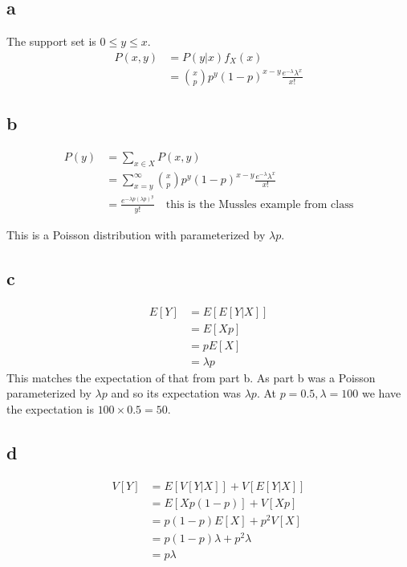 \documentclass[10pt]{article}
\begin{document}
\subsection*{a}

The support set is $0\le y\le x.$
\begin{align*}
    P(x,y)&=P(y|x)f_X(x)\\
    &= \binom{x}{p}p^y(1-p)^{x-y}\frac{e^{-\lambda}\lambda^x}{x!}
\end{align*}

\subsection*{b}
\begin{align*}
    P(y) &= \sum_{x\in X}P(x,y)\\
    &= \sum_{x=y}^\infty \binom{x}{p}p^y(1-p)^{x-y}\frac{e^{-\lambda}\lambda^x}{x!}\\
    &= \frac{e^{-\lambda p (\lambda p)^y}}{y!} \quad \text{this is the Mussles example from class}
\end{align*}

This is a Poisson distribution with parameterized by $\lambda p.$

\subsection*{c}

\begin{align*}
    E[Y] &= E[E[Y|X]]\\
    &= E[Xp]\\
    &= pE[X]\\
    &= \lambda p
\end{align*}
This matches the expectation of that from part b. As part b was a Poisson parameterized by $\lambda p$ and so its expectation was $\lambda p.$ At $p=0.5,\lambda=100$ we have the expectation is $100\times0.5=50.$

\subsection*{d}
\begin{align*}
    V[Y] &= E[V[Y|X]] + V[E[Y|X]]\\
    &= E[Xp(1-p)] + V[Xp]\\
    &= p(1-p)E[X] + p^2V[X]\\
    &= p(1-p)\lambda + p^2\lambda\\
    &= p\lambda
\end{align*}
\end{document}
